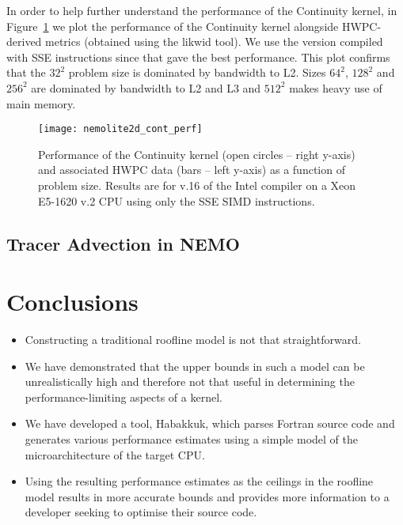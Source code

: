 \documentclass[12pt]{article}
\begin{document}
In order to help further understand the performance of the Continuity
kernel, in Figure~\ref{FIG_cont_perf} we plot the performance of the
Continuity kernel alongside HWPC-derived metrics (obtained using the
likwid tool). We use the version compiled with SSE instructions since
that gave the best performance. This plot confirms that the $32^2$
problem size is dominated by bandwidth to L2. Sizes $64^2$, $128^2$
and $256^2$ are dominated by bandwidth to L2 and L3 and $512^2$ makes
heavy use of main memory.

\begin{figure}
  \centering
  \texttt{[image: nemolite2d\_cont\_perf]}
  \caption{Performance of the Continuity kernel (open circles -- right y-axis)
    and associated HWPC data (bars -- left y-axis) as a function of
    problem size. Results are for v.16 of the Intel compiler on a Xeon
    E5-1620 v.2 CPU using only the SSE SIMD instructions.}
  \label{FIG_cont_perf}
\end{figure}

\subsection{Tracer Advection in NEMO}

\section{Conclusions}

\begin{itemize}
  
\item Constructing a traditional roofline model is not that straightforward.
  
\item We have demonstrated that the upper bounds in such a model can be
  unrealistically high and therefore not that useful in determining
  the performance-limiting aspects of a kernel.

\item We have developed a tool, Habakkuk, which parses Fortran source
  code and generates various performance estimates using a simple
  model of the microarchitecture of the target CPU.

\item Using the resulting performance estimates as the ceilings in the
  roofline model results in more accurate bounds and provides more
  information to a developer seeking to optimise their source code.

\end{itemize}



\end{document}

